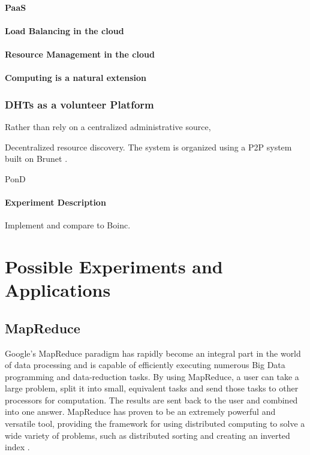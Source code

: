 \documentclass[10pt,letterpaper]{report}
\begin{document}
\subsubsection{PaaS}
\subsubsection{Load Balancing in the cloud}
\subsubsection{Resource Management in the cloud}
\subsubsection{Computing is a natural extension}

\subsection{DHTs as a volunteer Platform}
Rather than rely on a centralized administrative source,


Decentralized resource discovery.
The system is organized using a P2P system built on Brunet \cite{brunet}.



PonD \cite{leepond}
\subsubsection{Experiment Description}
Implement and compare to Boinc.



\chapter{Possible Experiments and Applications}


\section{MapReduce}

Google's MapReduce \cite{mapreduce} paradigm has rapidly become an integral part in the world of data processing and is capable of efficiently executing numerous Big Data programming and data-reduction tasks.  
By using MapReduce, a user can take a large problem, split it into small, equivalent tasks and send those tasks to other processors for computation.  
The results are sent back to the user and combined into one answer.  
MapReduce has proven to be an extremely powerful and versatile tool, providing the framework for using distributed computing to solve a wide variety of problems, such as distributed sorting and creating an inverted index \cite{mapreduce}. 
\end{document}
